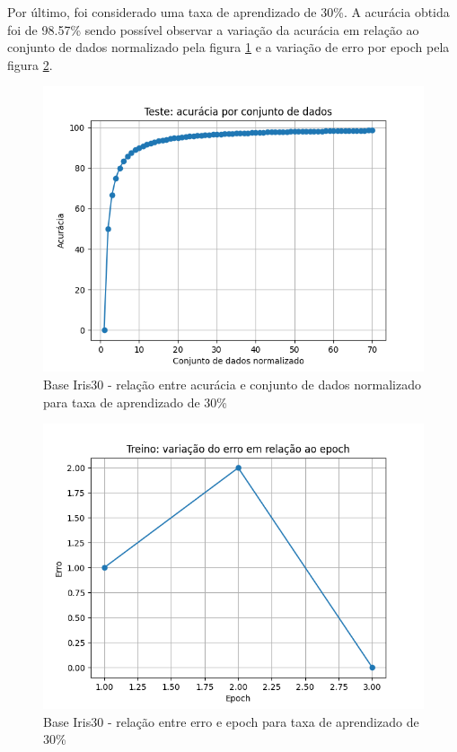 \documentclass[12pt, %
openright, 
oneside, %
a4paper,    %
brazil]{facom-ufu-abntex2}
\begin{document}
Por último, foi considerado uma taxa de aprendizado de 30\%. A acurácia obtida foi de 98.57\% sendo possível observar a variação da acurácia em relação ao conjunto de dados normalizado pela figura \ref{fig:11} e a variação de erro por epoch pela figura \ref{fig:12}.

\begin{figure}[H]
\centering
\includegraphics[scale=0.9]{figuras/acuracia_6.png}
\caption{Base Iris30 - relação entre acurácia e conjunto de dados normalizado para taxa de aprendizado de 30\%}
\label{fig:11}
\end{figure}

\begin{figure}[H]
\centering
\includegraphics[scale=0.9]{figuras/erro_6.png}
\caption{Base Iris30 - relação entre erro e epoch para taxa de aprendizado de 30\%}
\label{fig:12}
\end{figure}
\end{document}
